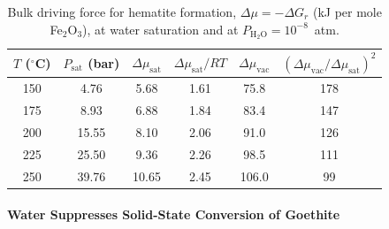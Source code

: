 \begin{table}[htbp]
  \centering
  \caption{Bulk driving force for hematite formation, $\Delta\mu = -\Delta G_r$ (kJ per mole Fe$_2$O$_3$), at water saturation and at $P_{\mathrm{H_2O}} = 10^{-8}$~atm.}
  \label{tab:gt_dmu}
  \begin{tabular}{cccccc}
    \hline
    $T$ ($^\circ$C) & $P_{\mathrm{sat}}$ (bar) & $\Delta\mu_{\mathrm{sat}}$ & $\Delta\mu_{\mathrm{sat}}/RT$ & $\Delta\mu_{\mathrm{vac}}$ & $(\Delta\mu_{\mathrm{vac}}/\Delta\mu_{\mathrm{sat}})^2$ \\
    \hline
    150 & 4.76  & 5.68  & 1.61 & 75.8  & 178 \\
    175 & 8.93  & 6.88  & 1.84 & 83.4  & 147 \\
    200 & 15.55 & 8.10  & 2.06 & 91.0  & 126 \\
    225 & 25.50 & 9.36  & 2.26 & 98.5  & 111 \\
    250 & 39.76 & 10.65 & 2.45 & 106.0 & 99  \\
    \hline
  \end{tabular}
\end{table}

\paragraph{Water Suppresses Solid-State Conversion of Goethite}\label{sec:gt_nucleation}

